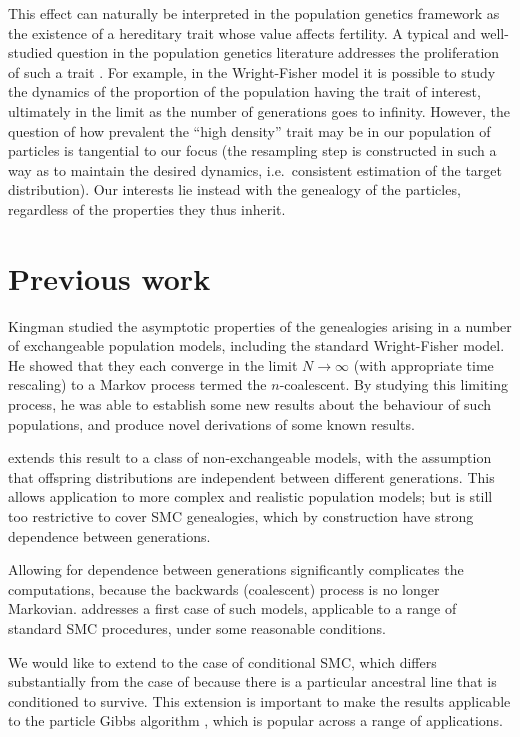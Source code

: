\documentclass{article}
\begin{document}
This effect can naturally be interpreted in the population genetics framework as the existence of a hereditary trait whose value affects fertility. A typical and well-studied question in the population genetics literature addresses the proliferation of such a trait \citep[Chapter 3]{wakeley2009}. For example, in the Wright-Fisher model it is possible to study the dynamics of the proportion of the population having the trait of interest, ultimately in the limit as the number of generations goes to infinity. However, the question of how prevalent the ``high density'' trait may be in our population of particles is tangential to our focus (the resampling step is constructed in such a way as to maintain the desired dynamics, i.e.\ consistent estimation of the target distribution). Our interests lie instead with the genealogy of the particles, regardless of the properties they thus inherit.


\section{Previous work}
Kingman \citep{kingman1982gene, kingman1982coal, kingman1982exch} studied the asymptotic properties of the genealogies arising in a number of exchangeable population models, including the standard Wright-Fisher model. He showed that they each converge in the limit $N\to\infty$ (with appropriate time rescaling) to a Markov process termed the $n$-coalescent. By studying this limiting process, he was able to establish some new results about the behaviour of such populations, and produce novel derivations of some known results.

\citet{mohle1998} extends this result to a class of non-exchangeable models, with the assumption that offspring distributions are independent between different generations. This allows application to more complex and realistic population models; but is still too restrictive to cover SMC genealogies, which by construction have strong dependence between generations.

Allowing for dependence between generations significantly complicates the computations, because the backwards (coalescent) process is no longer Markovian. \citet{koskela2018} addresses a first case of such models, applicable to a range of standard SMC procedures, under some reasonable conditions.

We would like to extend to the case of conditional SMC, which differs substantially from the case of \citet{koskela2018} because there is a particular ancestral line that is conditioned to survive. This extension is important to make the results applicable to the particle Gibbs algorithm \citep{andrieu2010}, which is popular across a range of applications.
\end{document}
